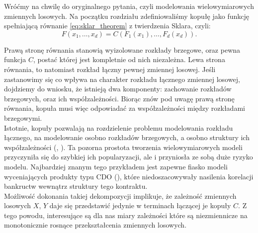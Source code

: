 Wróćmy na chwilę do oryginalnego pytania, czyli modelowania wielowymiarowych zmiennych losowych. Na początku rozdziału zdefiniowaliśmy kopułę jako funkcję spełniającą równanie \ref{eq:sklar_theorem} z twierdzenia Sklara, czyli:
$$F(x_1, \dots, x_d) = C(F_1(x_1), \dots, F_d(x_d)).$$

Prawą stronę równania stanowią wyizolowane rozkłady brzegowe, oraz pewna funkcja $C$, postać której jest kompletnie od nich niezależna. Lewa strona równania, to natomiast rozkład łączny pewnej zmiennej losowej. Jeśli zastanowimy się co wpływa na charakter rozkładu łącznego zmiennej losowej, dojdziemy do wniosku, że istnieją dwa komponenty: zachowanie rozkładów brzegowych, oraz ich współzależności. Biorąc znów pod uwagę prawą stronę równania, kopuła musi więc odpowiadać za współzależności między rozkładami brzegowymi. \\
Istotnie, kopuły pozwalają na rozdzielenie problemu modelowania rozkładu łącznego, na modelowanie osobno rozkładów brzegowych, a osobno struktury ich współzależności (\cite{Sklar_Theorem}, \cite{Joe_Multivariate_Models}). Ta pozorna prostota tworzenia wielowymiarowych modeli przyczyniła się do szybkiej ich popularyzacji, ale i przyniosła ze sobą duże ryzyko modelu. Najbardziej znanym tego przykładem jest zapewne fiasko modeli wyceniających produkty typu CDO (\cite{CDS_Copula}), które niedoszacowywały nasilenia korelacji bankructw wewnątrz struktury tego kontraktu.\\

Możliwość dokonania takiej dekompozycji implikuje, że zależność zmiennych losowych $X$, $Y$ daje się przedstawić jedynie w terminach łączącej je kopuły $C$. Z tego powodu, interesujące są dla nas miary zależności które są niezmiennicze na monotonicznie rosnące przekształcenia zmiennych losowych.

